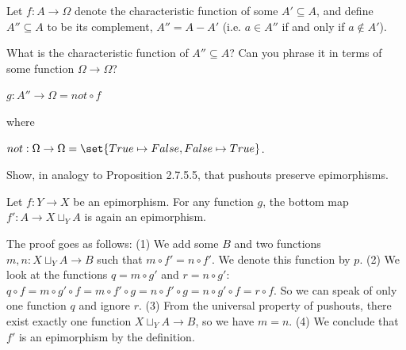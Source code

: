 \documentclass{article}
\begin{document}

Let $f: A \to \Omega$ denote the characteristic function of some $A' \subseteq A$, and
define $A'' \subseteq A$ to be its complement, $A'' = A - A'$ (i.e. $a \in A''$
if and only if $a \notin A'$).

\es What is the characteristic function of $A'' \subseteq A$?
\ei Can you phrase it in terms of some function $\Omega \to \Omega$?
\ee

\ans

$g: A'' \to \Omega = not \circ f$

where

$not: \Omega \to \Omega = \set{True \mapsto False, False \mapsto True}$.


Show, in analogy to Proposition 2.7.5.5, that pushouts preserve epimorphisms.

\ans

Let $f: Y \to X$ be an epimorphism. For any function $g$, the bottom map $f':A
\to X \sqcup_Y A$ is again an epimorphism.

\begin{center}
\end{center}

The proof goes as follows:
(1) We add some $B$ and two functions $m,n: X \sqcup_Y A \to B$ such that $m
\circ f' = n \circ f'$. We denote this function by $p$. (2) We look at the
functions $q = m \circ g'$ and $r = n \circ g'$: $q \circ f = m \circ g' \circ f
= m \circ f' \circ g = n \circ f' \circ g = n \circ g' \circ f = r \circ f$. So
we can speak of only one function $q$ and ignore $r$. (3) From the universal
property of pushouts, there exist exactly one function $X \sqcup_Y A \to B$, so
we have $m = n$. (4) We conclude that $f'$ is an epimorphism by the definition.
\end{document}
